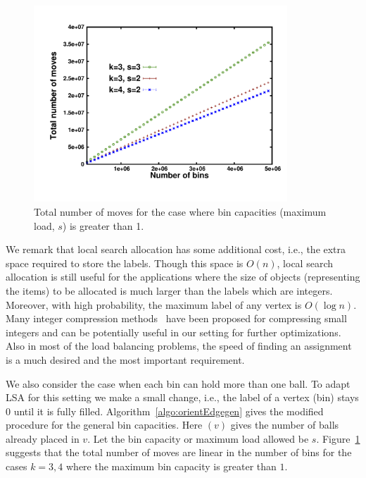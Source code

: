\begin{figure}[h!]
   \centering  
    \includegraphics[width=0.85\textwidth]{totalGen-3-2.pdf}
    \caption{Total number of moves for the case where bin capacities (maximum load, $s$) is greater than 1.}
    \label{fig:totalGen}
    \end{figure}

We remark that local search allocation has some additional cost, i.e., the extra space required to store the labels. Though this space is $O(n)$, local search allocation is still useful for the applications where the size of objects (representing the items) to be allocated is much larger than the labels which are integers. Moreover, with high probability, the maximum label of any vertex is $O(\log n)$. Many integer compression methods~\cite{inp:sgl10} have been proposed for compressing small integers and can be potentially useful in our setting for further optimizations. Also in most of the load balancing problems, the speed of finding an assignment is a much desired and the most important requirement.

We also consider the case when each bin can hold more than one ball. To adapt LSA for this setting we make a small change, i.e., the label of a vertex (bin) stays 0 until it is fully filled. Algorithm~\ref{algo:orientEdgegen} gives the modified procedure for the general bin capacities. Here {}$(v)$ gives the number of balls already placed in $v$. Let the bin capacity or maximum load allowed be $s$. Figure~\ref{fig:totalGen} suggests that the total number of moves are linear in the number of bins for the cases $k=3,4$ where the maximum bin capacity is greater than $1$.


